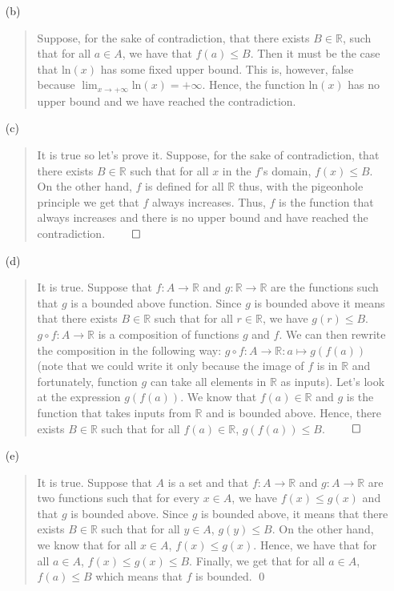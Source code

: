 \documentclass[12pt, a4paper]{article}
\newcommand{\reals}{\mathbb{R}}
\newcommand{\rarr}{\rightarrow}
\begin{document}
\begin{itemize}
\begin{itemize}
\item[(b)]
\begin{quote}
Suppose, for the sake of contradiction, that there exists $B \in \reals$, such that for all $a \in A$,
we have that $f(a) \leq B$. Then it must be the case that $\mbox{ln}(x)$ has some
fixed upper bound. This is, however, false because $\lim_{x \to + \infty} \mbox{ln}(x) = +\infty$.
Hence, the function $\mbox{ln}(x)$ has no upper bound and we have reached the contradiction.
\end{quote}

\item[]

\item[(c)]
\begin{quote}
It is true so let's prove it. Suppose, for the sake of contradiction, that there exists $B \in \reals$
such that for all $x$ in the $f$'s domain, $f(x) \leq B$. On the other hand, $f$ is defined for all $\reals$
thus, with the pigeonhole principle we get that $f$ always increases. Thus, $f$ is the function that
always increases and there is no upper bound and have reached the contradiction.
$\qed$
\end{quote}

\item[]

\item[(d)]
\begin{quote}
It is true. Suppose that $f : A \rarr \reals$ and $g : \reals \rarr \reals$ are the functions such that $g$ is a bounded above function.
Since $g$ is bounded above it means that there exists $B \in \reals$ such that for all $r \in \reals$, we have $g(r) \leq B$.
$g \circ f : A \rightarrow \reals$ is a composition of functions $g$ and $f$.
We can then rewrite the composition in the following way: $g \circ f : A \rarr \reals : a \mapsto g(f(a))$ (note that we could write it only because
the image of $f$ is in $\reals$ and fortunately, function $g$ can take all elements in $\reals$ as inputs).
Let's look at the expression $g(f(a))$. We know that $f(a) \in \reals$ and $g$ is the function that takes inputs from $\reals$
and is bounded above. Hence, there exists $B \in \reals$ such that for all $f(a) \in \reals$, $g(f(a)) \leq B$.
$\qed$
\end{quote}

\item[]

\item[(e)]
\begin{quote}
It is true. Suppose that $A$ is a set and that $f : A \rarr \reals$ and $g : A \rarr \reals$ are two functions
such that for every $x \in A$, we have $f(x) \leq g(x)$ and that $g$ is bounded above. Since $g$ is bounded
above, it means that there exists $B \in \reals$ such that for all $y \in A$, $g(y) \leq B$. On the other hand,
we know that for all $x \in A$, $f(x) \leq g(x)$. Hence, we have that for all $a \in A$, $f(x) \leq g(x) \leq B$.
Finally, we get that for all $a \in A$, $f(a) \leq B$ which means that $f$ is bounded.
\qed
\end{quote}


\end{itemize}
\end{itemize}
\end{document}
